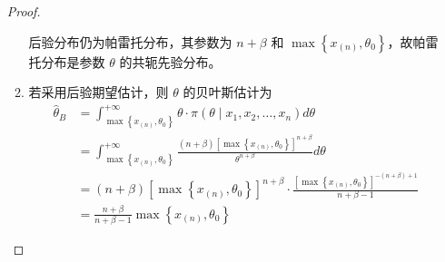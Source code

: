 \documentclass[normal,founder,mtpro2,cn]{elegantnote}
\begin{document}
\begin{enumerate}
\begin{proof}
\begin{enumerate}
                      后验分布仍为帕雷托分布，其参数为 $n+\beta$ 和 $\max\left\{x_{(n)},\theta_{0}\right\}$，故帕雷托分布是参数 $\theta$ 的共轭先验分布。
                \item
                      若采用后验期望估计，则 $\theta$ 的贝叶斯估计为
                      \begin{equation*}
                          \begin{aligned}
                              \hat{\theta}_{B} & =\int_{\max\left\{x_{(n)},\theta_{0}\right\}}^{+\infty}\theta\cdot\pi\left(\theta\mid x_{1},x_{2},\ldots,x_{n}\right) d \theta                                     \\
                                               & =\int_{\max \left\{x_{(n)},\theta_{0}\right\}}^{+\infty} \frac{(n+\beta)\left[\max \left\{x_{(n)},\theta_{0}\right\}\right]^{n+\beta}}{\theta^{n+\beta}} d \theta  \\
                                               & =(n+\beta)\left[\max \left\{x_{(n)},\theta_{0}\right\}\right]^{n+\beta} \cdot \frac{\left[\max \left\{x_{(n)},\theta_{0}\right\}\right]^{-(n+\beta)+1}}{n+\beta-1} \\
                                               & =\frac{n+\beta}{n+\beta-1} \max \left\{x_{(n)},\theta_{0}\right\}
                          \end{aligned}
                      \end{equation*}
            \end{enumerate}
        \end{proof}
\end{enumerate}
\end{document}
